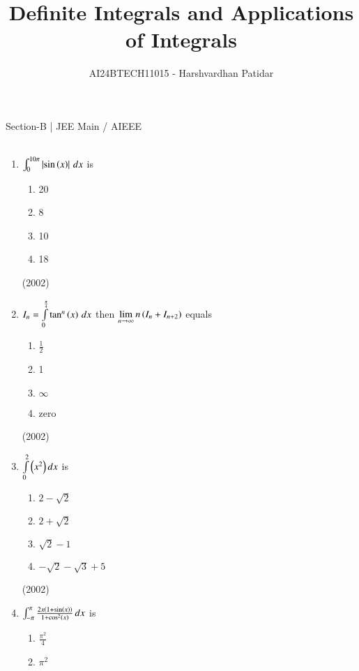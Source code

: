 \documentclass[journal,12pt,twocolumn]{IEEEtran}
\theoremstyle{remark}
\begin{document}

\vspace{3cm}

\title{Definite Integrals and Applications of Integrals}
\author{AI24BTECH11015 - Harshvardhan Patidar}
\maketitle
\newpage
\bigskip

\renewcommand{\thefigure}{\theenumi}
\renewcommand{\thetable}{\theenumi}



Section-B | JEE Main / AIEEE \\ \\
\begin{enumerate}
	\item 
		$\int_0^{10\pi} \left\vert\sin \left(x\right)\right\vert \, dx$ is  
		\begin{enumerate}
			\item 20\item 8\item 10\item 18
		\end{enumerate} 
		\hfill (2002)
	\item
		$I_n = \int \limits_{0}^{\frac{\pi}{4}} \tan^n \left(x\right) \, dx$ then $\lim \limits_{n \to \infty} n\left(I_n + I_{n+2}\right)$ equals 
				\begin{enumerate}
					\item $\frac{1}{2}$
	 				\item 1
					\item $\infty$
					\item zero
	 			\end{enumerate}
				\hfill(2002)
	\item
		$ \int \limits_0^2 \left(x^2\right)dx $ is  
			\begin{enumerate}
				\item $2-\sqrt2$
				 \item $2+\sqrt2$
				\item $\sqrt2 - 1$
				\item $-\sqrt2 - \sqrt3 + 5$
			\end{enumerate}
			\hfill (2002)
	\item 
		$ \int_{-\pi}^{\pi} \frac{2x\left(1 + \sin \left(x\right)\right)}{1+\cos^2 \left(x\right)} \, dx$ is
			\begin{enumerate}
				\itemsep0.3em
					\item $\frac{\pi^2}{4}$
					\item $\pi^2$

\end{enumerate}
\end{enumerate}
\end{document}
